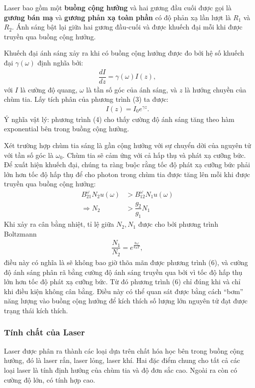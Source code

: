 \documentclass{report}
\newcommand{\f}[2]{\dfrac{#1}{#2}}
\begin{document}
Laser bao gồm một \textbf{buồng cộng hưởng} và hai gương đầu cuối được gọi là \textbf{gương bán mạ} và \textbf{gương phản xạ toàn phần} có độ phản xạ lần lượt là $R_1$ và $R_2$. Ánh sáng bật lại giữa hai gương đầu-cuối và được khuếch đại mỗi khi được truyền qua buồng cộng hưởng.

Khuếch đại ánh sáng xảy ra khi có buồng cộng hưởng được đo bởi hệ số khuếch đại $\gamma(\omega)$ định nghĩa bởi:
\begin{align}
	\f{d I}{d z} = \gamma(\omega) I(z),
\end{align}
với	$I$ là cường độ quang, $\omega$ là tần số góc của ánh sáng, và $z$ là hướng chuyền của chùm tia. Lấy tích phân của phương trình (3) ta được:
\begin{align}
	I(z) = I_0 e^{\gamma z}.
\end{align}
Ý nghĩa vật lý: phương trình (4) cho thấy cường độ ánh sáng tăng theo hàm exponential bên trong buồng cộng hưởng.

Xét trường hợp chùm tia sáng là gần cộng hưởng với sự chuyển dời của nguyên tử với tần số góc là $\omega_0$. Chùm tia sẽ cảm ứng với cả hấp thụ và phát xạ cưỡng bức. Để xuất hiện khuếch đại, chúng ta ràng buộc rằng tốc độ phát xạ cưỡng bức phải lớn hơn tốc độ hấp thụ để cho photon trong chùm tia được tăng lên mỗi khi được truyền qua buồng cộng hưởng:
\begin{align}
	B_{21}^{\omega} N_2 u(\omega) & > B_{12}^{\omega} N_1 u(\omega) \\
	\Rightarrow N_2               & > \f{g_2}{g_1}N_1
\end{align}
Khi xảy ra cân bằng nhiệt, tỉ lệ giữa $N_2,N_1$ được cho bởi phương trình Boltzmann
\begin{align*}
	\f{N_1}{N_2} = e^{\frac{\hbar \omega}{k_B T}},
\end{align*}
điều này có nghĩa là sẽ không bao giờ thõa mãn được phương trình (6), và cường độ ánh sáng phân rã bằng cường độ ánh sáng truyền qua bởi vì tốc độ hấp thụ	lớn hơn tốc độ phát xạ cưỡng bức. Từ đó phương trình (6) chỉ đúng khi và chỉ khi điều kiện không cân bằng. Điều này có thể quan sát được bằng cách ``bơm'' năng lượng vào buồng cộng hưởng để kích thích số lượng lớn nguyên tử đạt được trạng thái kích thích.

\subsubsection{Tính chất của Laser}
Laser được phân ra thành các loại dựa trên chất hóa học bên trong buồng cộng hưởng, đó là laser rắn, laser lỏng, laser khí. Hai đặc điểm chung cho tất cả các loại laser là tính định hướng của chùm tia và độ đơn sắc cao. Ngoài ra còn có cường độ lớn, có tính hợp cao.
\end{document}
